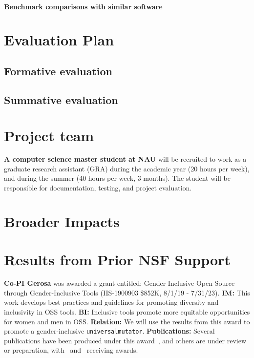 \documentclass[numbers]{proposalnsf}
\newcommand{\um}{\texttt{universalmutator}}
\begin{document}
\paragraph{Benchmark comparisons with similar software}


\section{Evaluation Plan} \label{sec:eval}

\subsection{Formative evaluation}


\subsection{Summative evaluation}

\section{Project team}


\textbf{A computer science master student at NAU} will be recruited to work as a graduate research assistant (GRA) during the academic year (20 hours per week), and during the summer (40 hours per week, 3 months).
The student will be responsible for documentation, testing, and project evaluation.

\section{Broader Impacts}



\section{Results from Prior NSF Support}



\textbf{Co-PI Gerosa} was awarded a grant entitled: Gender-Inclusive Open Source through Gender-Inclusive Tools (IIS-1900903 \$852K, 8/1/19 - 7/31/23). 
\textbf{IM:} This work develops best practices and guidelines for promoting diversity and inclusivity in OSS tools. 
\textbf{BI:} Inclusive tools promote more equitable opportunities for women and men in OSS. 
\textbf{Relation:} We will use the results from this award to promote a gender-inclusive  \um.
\textbf{Publications:} Several publications have been produced under this award~\cite{balali2020recommending,dias2021makes,silva2020google,gerosa2021shifting,silva2020theory,trinkenreich2020hidden,chatterjee2021aid,mendez2019gendermag,stumpf2020gender,guizani2020gender,hilderbrand2020engineering,padala2020gender,wessel2020effects}, and others are under review or preparation, with~\cite{balali2020recommending} and~\cite{wessel2020effects} receiving awards. 


\newpage
%


\end{document}
